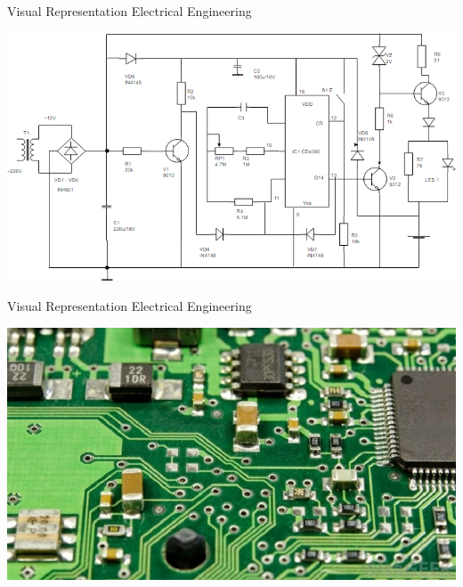 \documentclass{beamer}
\begin{document}
\begin{frame}[fragile]{Visual Representation}
{Electrical Engineering}

\begin{center}
\includegraphics[width=\textwidth]{images/circuit-diagram-example.png}
\end{center}
\end{frame}

\begin{frame}[fragile]{Visual Representation}
{Electrical Engineering}

\begin{center}
\includegraphics[width=\textwidth]{images/article-Electric-Circuits-rA3.jpg}
\end{center}
\end{frame}
\end{document}
